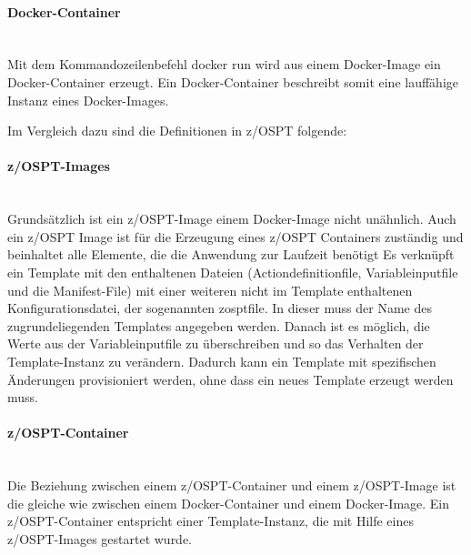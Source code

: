 \paragraph{\glqq Docker-Container\grqq}~\\
Mit dem Kommandozeilenbefehl \glqq docker run\grqq{} wird aus einem Docker-Image ein Docker-Container erzeugt.
Ein Docker-Container beschreibt somit eine lauffähige Instanz eines Docker-Images.
\cite{Vohra.2016}

Im Vergleich dazu sind die Definitionen in z/OSPT folgende:

\paragraph{\glqq z/OSPT-Images\grqq}~\\
Grundsätzlich ist ein z/OSPT-Image einem Docker-Image nicht unähnlich.
Auch ein z/OSPT Image ist für die Erzeugung eines z/OSPT Containers zuständig und beinhaltet alle Elemente, die die Anwendung zur Laufzeit benötigt
Es verknüpft ein Template mit den enthaltenen Dateien (Actiondefinitionfile, Variableinputfile und die Manifest-File) mit einer weiteren nicht im Template enthaltenen Konfigurationsdatei, der sogenannten \glqq zosptfile\grqq.
In dieser muss der Name des zugrundeliegenden Templates angegeben werden.
Danach ist es möglich, die Werte aus der Variableinputfile zu überschreiben und so das Verhalten der Template-Instanz zu verändern.
Dadurch kann ein Template mit spezifischen Änderungen provisioniert werden, ohne dass ein neues Template erzeugt werden muss.

\paragraph{\glqq z/OSPT-Container\grqq}~\\
Die Beziehung zwischen einem z/OSPT-Container und einem z/OSPT-Image ist die gleiche wie zwischen einem Docker-Container und einem Docker-Image.
Ein z/OSPT-Container entspricht einer Template-Instanz, die mit Hilfe eines z/OSPT-Images gestartet wurde.

